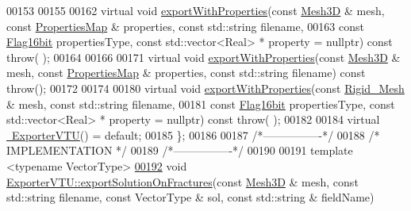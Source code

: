 \begin{DoxyCode}
00153 
00155 
00162     \textcolor{keyword}{virtual} \textcolor{keywordtype}{void} \hyperlink{classFVCode3D_1_1ExporterVTU_a12240c4de9e7b3a5bf8f513c873c4547}{exportWithProperties}(\textcolor{keyword}{const} \hyperlink{classFVCode3D_1_1Mesh3D}{Mesh3D} & mesh, \textcolor{keyword}{const} 
      \hyperlink{classFVCode3D_1_1PropertiesMap}{PropertiesMap} & properties, \textcolor{keyword}{const} std::string filename,
00163         \textcolor{keyword}{const} \hyperlink{namespaceFVCode3D_a17a9cb86e2e25bbfbfcb645a2eec1d64}{Flag16bit} propertiesType, \textcolor{keyword}{const} std::vector<Real> * property = \textcolor{keyword}{nullptr}) \textcolor{keyword}{const} \textcolor{keywordflow}{throw}(
      );
00164 
00166 
00171     \textcolor{keyword}{virtual} \textcolor{keywordtype}{void} \hyperlink{classFVCode3D_1_1ExporterVTU_a12240c4de9e7b3a5bf8f513c873c4547}{exportWithProperties}(\textcolor{keyword}{const} \hyperlink{classFVCode3D_1_1Mesh3D}{Mesh3D} & mesh, \textcolor{keyword}{const} 
      \hyperlink{classFVCode3D_1_1PropertiesMap}{PropertiesMap} & properties, \textcolor{keyword}{const} std::string filename) \textcolor{keyword}{const} \textcolor{keywordflow}{throw}();
00172 
00174 
00180     \textcolor{keyword}{virtual} \textcolor{keywordtype}{void} \hyperlink{classFVCode3D_1_1ExporterVTU_a12240c4de9e7b3a5bf8f513c873c4547}{exportWithProperties}(\textcolor{keyword}{const} \hyperlink{classFVCode3D_1_1Rigid__Mesh}{Rigid\_Mesh} & mesh, \textcolor{keyword}{const} 
      std::string filename,
00181         \textcolor{keyword}{const} \hyperlink{namespaceFVCode3D_a17a9cb86e2e25bbfbfcb645a2eec1d64}{Flag16bit} propertiesType, \textcolor{keyword}{const} std::vector<Real> * property = \textcolor{keyword}{nullptr}) \textcolor{keyword}{const} \textcolor{keywordflow}{throw}(
      );
00182 
00184     \textcolor{keyword}{virtual} \hyperlink{classFVCode3D_1_1ExporterVTU_a50483218cd7944d4b421156a1e534c32}{~ExporterVTU}() = \textcolor{keywordflow}{default};
00185 \};
00186 
00187 \textcolor{comment}{/*----------------*/}
00188 \textcolor{comment}{/* IMPLEMENTATION */}
00189 \textcolor{comment}{/*----------------*/}
00190 
00191 \textcolor{keyword}{template} <\textcolor{keyword}{typename} VectorType>
\hypertarget{ExportVTU_8hpp_source.tex_l00192}{}\hyperlink{classFVCode3D_1_1ExporterVTU_abc88a5113c02b55942862ef39b30ec80}{00192} \textcolor{keywordtype}{void} \hyperlink{classFVCode3D_1_1ExporterVTU_abc88a5113c02b55942862ef39b30ec80}{ExporterVTU::exportSolutionOnFractures}(\textcolor{keyword}{const} 
      \hyperlink{classFVCode3D_1_1Mesh3D}{Mesh3D} & mesh, \textcolor{keyword}{const} std::string filename, \textcolor{keyword}{const} VectorType & sol, \textcolor{keyword}{const} std::string & fieldName) \textcolor{keyword}{
}
\end{DoxyCode}
